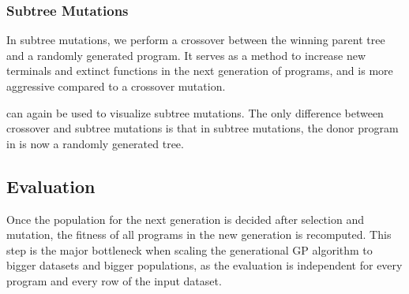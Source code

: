 \subsubsection{Subtree Mutations}
\label{subsec:subtree}
In subtree mutations, we perform a crossover between the winning parent tree and a randomly generated program. It serves as a method to increase new terminals and extinct functions in the next generation of programs, and is more aggressive compared to a crossover mutation\citep{gplearn}.

 can again be used to visualize subtree mutations. The only difference between crossover and subtree mutations is that in subtree mutations, the donor program in  is now a randomly generated tree. 


  
\subsection{Evaluation}
\label{subsec:evaluation}
Once the population for the next generation is decided after selection and mutation, the fitness of all programs in the new generation is recomputed. This step is the major bottleneck when scaling the generational GP algorithm to bigger datasets and bigger populations, as the evaluation is independent for every program and every row of the input dataset. 

